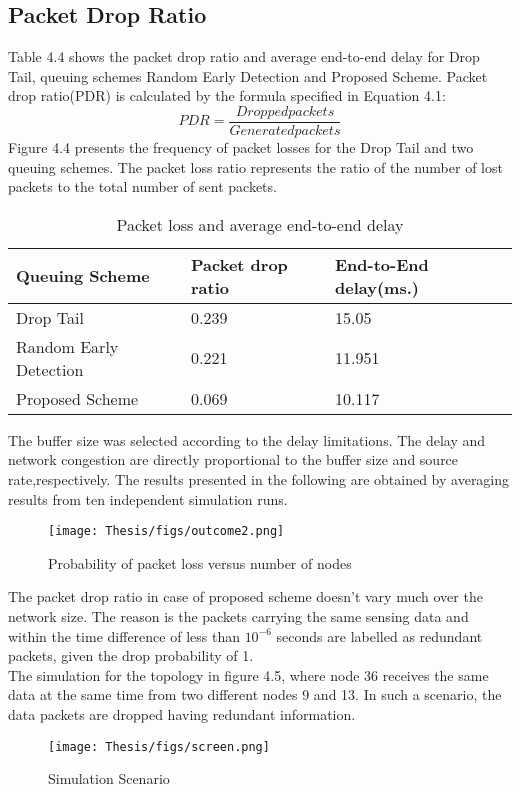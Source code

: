 \subsection{Packet Drop Ratio}
Table 4.4 shows the packet drop ratio and average end-to-end delay for Drop Tail, queuing schemes Random Early Detection and Proposed Scheme.
Packet drop ratio(PDR) is calculated by the formula specified in Equation 4.1: \\
\begin{equation}
    PDR = \frac{Dropped packets}{Generated packets}
\end{equation}
Figure 4.4 presents the frequency of packet losses for the Drop Tail and two queuing schemes. The packet loss ratio represents the ratio of the number of lost packets to the total number of sent packets.
\begin{table}[h!]
\begin{center}
\begin{tabular}{|p{3.5cm}|p{3.5cm}|p{4.2cm}|  }
\hline
Queuing Scheme & Packet drop ratio & End-to-End delay(ms.) \\
\hline
Drop Tail & 0.239 & 15.05\\
\hline
Random Early Detection & 0.221 & 11.951   \\
\hline
Proposed Scheme & 0.069 & 10.117 \\

\hline
\end{tabular}
\caption{Packet loss and average end-to-end delay}
\end{center}
\end{table}
The buffer size was selected according to the delay limitations. The
delay and network congestion are directly proportional to the buffer size and source rate,respectively. The results presented in the following are obtained by averaging results from ten independent simulation runs.
\begin{figure}[h!]
    \centering
    \texttt{[image: Thesis/figs/outcome2.png]}
    \caption{Probability of packet loss versus number of nodes}
    \label{fig:my_label}
\end{figure}
The packet drop ratio in case of proposed scheme doesn't vary much over the network size. The reason is the packets carrying the same sensing data and within the time difference of less than $10^{-6}$ seconds are labelled as redundant packets, given the drop probability of 1. \\
The simulation for the topology in figure 4.5, where node 36 receives the same data at the same time from two different nodes 9 and 13. In such a scenario, the data packets are dropped having redundant information.  
\begin{figure}[h!]
    \centering
    \texttt{[image: Thesis/figs/screen.png]}
    \caption{Simulation Scenario}
    \label{fig:my_label}
\end{figure}
